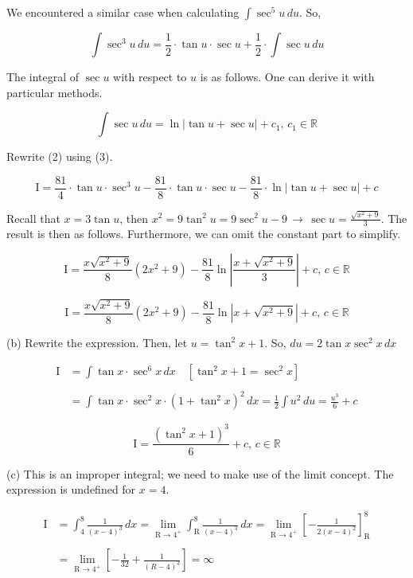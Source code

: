 \documentclass{article}
\begin{document}
\hfill

\noindent We encountered a similar case when calculating $\displaystyle \int\sec^5 u \, du$. So,

\[\int\sec^3u\,du= \frac12\cdot\tan u \cdot\sec u + \frac12\cdot\int \sec u\,du\]

\hfill

\noindent The integral of $\sec u$ with respect to $u$ is as follows. One can derive it with particular methods.

\begin{equation}\int\sec u \, du = \ln|\tan u + \sec u| + c_1,\,c_1\in\mathbb{R}
\end{equation}

\hfill

\noindent Rewrite (2) using (3).

\[\mathrm{I} = \frac{81}4\cdot\tan u\cdot\sec^3 u -\frac{81}{8} \cdot\tan u \cdot\sec u-\frac{81}{8}\cdot\ln|\tan u + \sec u| + c\]

\hfill

\noindent Recall that $x=3\tan u$, then $\displaystyle x^2 = 9\tan^2u = 9\sec^2u-9\,\rightarrow\, \sec u =\frac{\sqrt{x^2+9}}3$. The result is then as follows. Furthermore, we can omit the constant part to simplify.

\[\mathrm{I}=\frac{x\sqrt{x^2+9}}8\left(2x^2+9\right)-\frac{81}8\ln\left|\frac{x+\sqrt{x^2+9}}3\right| + c,\,c\in\mathbb{R}\]

\[\boxed{\mathrm{I}=\frac{x\sqrt{x^2+9}}8\left(2x^2+9\right)-\frac{81}8\ln\left|x+\sqrt{x^2+9}\right| + c,\,c\in\mathbb{R}}\]

\newpage

\noindent (b) Rewrite the expression. Then, let $u =\tan^2x + 1$. So, $du=2\tan x \sec^2 x\,dx$

\begin{align*}
\mathrm{I} &=\int\tan x \cdot\sec^6 x\, dx \quad\left[\tan^2x+1=\sec^2x\right] \\\\ &= \int\tan x\cdot\sec^2x\cdot(1+\tan^2x)^2 \,dx=\frac12\int u^2 \,du  = \frac{u^3}6 + c
\end{align*}

\[\boxed{\mathrm{I}=\frac{(\tan^2x+1)^3}{6} + c, \, c\in \mathbb{R}}\]

\noindent (c) This is an improper integral; we need to make use of the limit concept. The expression is undefined for $x=4$.

\begin{align*}
\mathrm{I} &= \int_4^8\frac1{(x-4)^3}\,dx = \lim_{\mathrm{R}\to4^+}\int_\mathrm{R}^8\frac1{(x-4)^3}\,dx=\lim_{\mathrm{R}\to4^+} \left[-\frac1{2(x-4)^2}\right]_\mathrm{R}^8\\\\&=\lim_{\mathrm{R}\to4^+} \left[-\frac1{32} + \frac1{(R-4)^2}\right]=\boxed\infty
\end{align*}
\end{document}
